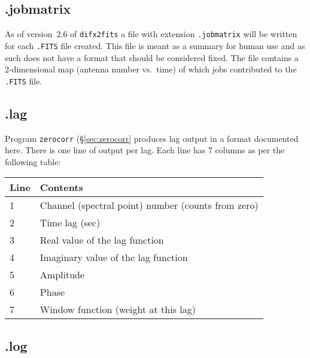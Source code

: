 
\subsection{.jobmatrix} \label{sec:jobmatrixfile}

As of version~2.6 of {\tt difx2fits} a file with extension {\tt .jobmatrix} will be written for each {\tt .FITS} file created.
This file is meant as a summary for human use and as such does not have a format that should be considered fixed.
The file contains a 2-dimensional map (antenna number vs.\ time) of which jobs contributed to the {\tt .FITS} file.






\subsection{.lag} \label{sec:lag}

Program {\tt zerocorr} (\S\ref{sec:zerocorr} produces lag output in a format documented here.
There is one line of output per lag.
Each line has 7 columns as per the following table:
\begin{center}
\begin{tabular}{ll}
\hline
Line & Contents \\
\hline
1 & Channel (spectral point) number (counts from zero) \\
2 & Time lag (sec) \\
3 & Real value of the lag function \\
4 & Imaginary value of the lag function \\
5 & Amplitude \\
6 & Phase \\
7 & Window function (weight at this lag) \\
\hline
\end{tabular}
\end{center}




\subsection{.log} \label{sec:log}

